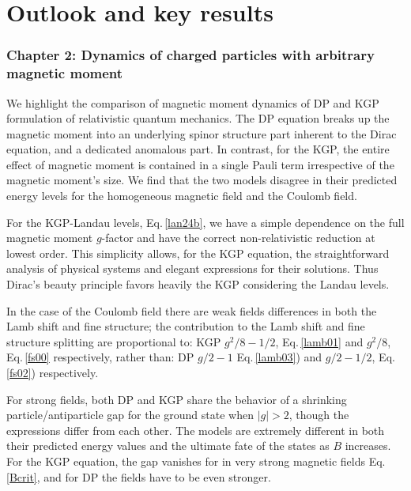 \chapter{Outlook and key results}
\label{chap:outlook}

\subsection*{Chapter 2: Dynamics of charged particles with arbitrary magnetic moment}
\label{sec:chap2}
We highlight the comparison of magnetic moment dynamics of DP and KGP formulation of relativistic quantum mechanics. The DP equation breaks up the magnetic moment into an underlying spinor structure part inherent to the Dirac equation, and a dedicated anomalous part. In contrast, for the KGP, the entire effect of magnetic moment is contained in a single Pauli term irrespective of the magnetic moment\rq s size. We find that the two models disagree in their predicted energy levels for the homogeneous magnetic field and the Coulomb field.

For the KGP-Landau levels, Eq.\,\eqref{lan24b}, we have a simple dependence on the full magnetic moment $g$-factor and have the correct non-relativistic reduction at lowest order. This simplicity allows, for the KGP equation, the straightforward analysis of physical systems and elegant expressions for their solutions. Thus Dirac's beauty principle favors heavily the KGP considering the Landau levels.

In the case of the Coulomb field there are weak fields differences in both the Lamb shift and fine structure; the contribution to the Lamb shift and fine structure splitting are proportional to: KGP $g^{2}/8-1/2$, Eq.\,\eqref{lamb01} and $g^{2}/8$, Eq.\,\eqref{fs00} respectively, rather than: DP $g/2-1$ Eq.\,\eqref{lamb03}) and $g/2-1/2$, Eq.\,\eqref{fs02}) respectively.

For strong fields, both DP and KGP share the behavior of a shrinking particle/antiparticle gap for the ground state when $|g|>2$, though the expressions differ from each other. The models are extremely different in both their predicted energy values and the ultimate fate of the states as $B$ increases. For the KGP equation, the gap vanishes for in very strong magnetic fields Eq.\,\eqref{Bcrit}, and for DP the fields have to be even stronger.

